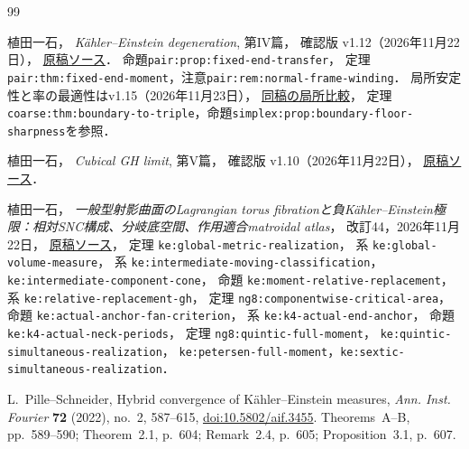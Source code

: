 \documentclass[a4paper,11pt]{ltjsarticle}
\numberwithin{equation}{section}
\theoremstyle{plain}
\theoremstyle{definition}
\theoremstyle{remark}
\begin{document}
\begin{thebibliography}{99}
\footnotesize

植田一石，
\newblock \emph{Kähler--Einstein degeneration}, 第IV篇，
\newblock 確認版 v1.12（2026年11月22日），
\newblock \href{https://github.com/uedakazushi/kaehler-einstein-degeneration/blob/11910259dd1628d542df57d370123d0a40b08d61/papers/kaehler-einstein-degeneration.tex}{原稿ソース}．
\newblock 命題\texttt{pair:prop:fixed-end-transfer}，
定理\texttt{pair:thm:fixed-end-moment}，注意\texttt{pair:rem:normal-frame-winding}．
\newblock 局所安定性と率の最適性はv1.15（2026年11月23日），
\href{https://github.com/uedakazushi/kaehler-einstein-degeneration/blob/1ee0acaf876b1334c964d60c409feb3b18b62373/papers/kaehler-einstein-degeneration.tex}{同稿の局所比較}，
定理\texttt{coarse:thm:boundary-to-triple}，命題\texttt{simplex:prop:boundary-floor-sharpness}を参照．

植田一石，
\newblock \emph{Cubical GH limit}, 第V篇，
\newblock 確認版 v1.10（2026年11月22日），
\newblock \href{https://github.com/uedakazushi/kaehler-einstein-degeneration/blob/main/papers/cubical-gh-limit.tex}{原稿ソース}．

植田一石，
\newblock \emph{一般型射影曲面のLagrangian torus fibrationと負Kähler--Einstein極限：相対SNC構成、分岐底空間、作用適合matroidal atlas}，
\newblock 改訂44，2026年11月22日，
\newblock \href{https://github.com/uedakazushi/surface-lagrangian-torus-fibration/blob/1088f86cf8f0c70c74a1e4caa3b90393ff627067/papers/surface-lagrangian-torus-fibration.tex}{原稿ソース}，
\newblock 定理 \texttt{ke:global-metric-realization}，
\newblock 系 \texttt{ke:global-volume-measure}，
\newblock 系 \texttt{ke:intermediate-moving-classification}，\texttt{ke:intermediate-component-cone}，
\newblock 命題 \texttt{ke:moment-relative-replacement}，系 \texttt{ke:relative-replacement-gh}，
定理 \texttt{ng8:componentwise-critical-area}，命題 \texttt{ke:actual-anchor-fan-criterion}，
系 \texttt{ke:k4-actual-end-anchor}，
命題 \texttt{ke:k4-actual-neck-periods}，
定理 \texttt{ng8:quintic-full-moment}，
\texttt{ke:quintic-simultaneous-realization}，
\texttt{ke:petersen-full-moment}，\texttt{ke:sextic-simultaneous-realization}．

L.~Pille--Schneider,
\newblock Hybrid convergence of Kähler--Einstein measures,
\newblock \emph{Ann. Inst. Fourier} \textbf{72} (2022), no.~2, 587--615,
\newblock \href{https://doi.org/10.5802/aif.3455}{doi:10.5802/aif.3455}.
\newblock Theorems~A--B, pp.~589--590; Theorem~2.1, p.~604;
Remark~2.4, p.~605; Proposition~3.1, p.~607.


\end{thebibliography}
\end{document}
